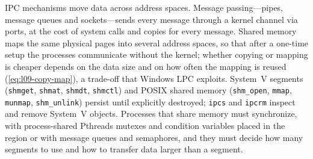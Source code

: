 \documentclass[../main.tex]{subfiles}
\begin{document}
\begin{keypoint}
  IPC mechanisms move data across address spaces.  Message passing---pipes,
  message queues and sockets---sends every message through a kernel channel
  via ports, at the cost of system calls and copies for every message.
  Shared memory maps the same physical pages into several address spaces, so
  that after a one-time setup the processes communicate without the kernel;
  whether copying or mapping is cheaper depends on the data size and on how
  often the mapping is reused (\cref{eq:l09-copy-map}), a trade-off that
  Windows LPC exploits.  System~V segments (\texttt{shmget}, \texttt{shmat},
  \texttt{shmdt}, \texttt{shmctl}) and POSIX shared memory
  (\texttt{shm\_open}, \texttt{mmap}, \texttt{munmap}, \texttt{shm\_unlink})
  persist until explicitly destroyed; \texttt{ipcs} and \texttt{ipcrm}
  inspect and remove System~V objects.  Processes that share memory must
  synchronize, with process-shared Pthreads mutexes and condition variables
  placed in the region or with message queues and semaphores, and they must
  decide how many segments to use and how to transfer data larger than a
  segment.
\end{keypoint}
\end{document}
